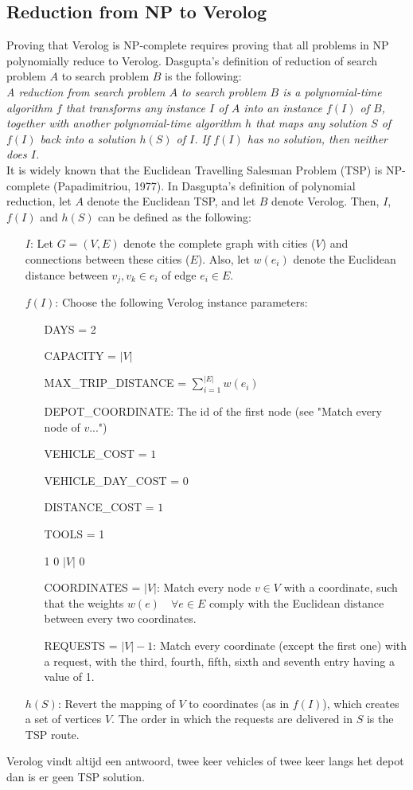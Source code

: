 \documentclass[a4paper]{article}
\begin{document}
\subsection{Reduction from NP to Verolog}
Proving that Verolog is NP-complete requires proving that all problems in NP polynomially reduce to Verolog. Dasgupta's definition of reduction of search problem $A$ to search problem $B$ is the following: \\

\emph{A reduction from search problem $A$ to search problem $B$ is a polynomial-time algorithm $f$ that transforms any instance $I$ of $A$ into an instance $f(I)$ of $B$, together with another polynomial-time algorithm $h$ that maps any solution $S$ of $f(I)$ back into a solution $h(S)$ of $I$. If $f(I)$ has no solution, then neither does $I$.} \\

It is widely known that the Euclidean Travelling Salesman Problem (TSP) is NP-complete (Papadimitriou, 1977). In Dasgupta's definition of polynomial reduction, let $A$ denote the Euclidean TSP, and let $B$ denote Verolog. Then, $I$, $f(I)$ and $h(S)$ can be defined as the following:
\begin{itemize}
	\item[$I$:] Let $G=(V,E)$ denote the complete graph with cities ($V$) and connections between these cities ($E$). Also, let $w(e_i)$ denote the Euclidean distance between $v_j, v_k \in e_i$ of edge $e_i \in E$.
	\item[$f(I)$:] Choose the following Verolog instance parameters:
	\begin{itemize}
		\item[] DAYS = 2
		\item[] CAPACITY = $|V|$
		\item[] MAX\_TRIP\_DISTANCE = $\sum_{i=1}^{|E|}w(e_i)$
		\item[] DEPOT\_COORDINATE: The id of the first node (see "Match every node of $v$...")
	 	\item[] VEHICLE\_COST = $1$
	 	\item[] VEHICLE\_DAY\_COST = 0
	 	\item[] DISTANCE\_COST = $1$
	 	\item[] TOOLS = 1
	 	\item[] 1 0 $|V|$ 0
	 	\item[] COORDINATES = $|V|$: Match every node $v \in V$ with a coordinate, such that the weights $w(e) \quad \forall e \in E$ comply with the Euclidean distance between every two coordinates.
	 	\item[] REQUESTS = $|V|-1$: Match every coordinate (except the first one) with a request, with the third, fourth, fifth, sixth and seventh entry having a value of 1.
	 \end{itemize} 
	 \item[$h(S)$:] Revert the mapping of $V$ to coordinates (as in $f(I)$), which creates a set of vertices $V$. The order in which the requests are delivered in $S$ is the TSP route. 
\end{itemize}
Verolog vindt altijd een antwoord, twee keer vehicles of twee keer langs het depot dan is er geen TSP solution. 
\end{document}
